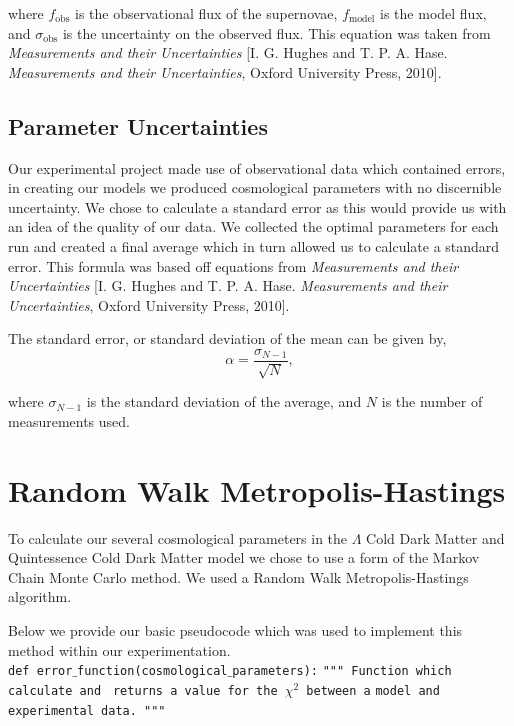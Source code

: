 \documentclass[twocolumn]{revtex4}
\begin{document}
{{{where $f_\text{obs}$ is the observational flux of the supernovae, $f_\text{model}$ is the model flux, and $\sigma_\text{obs}$ is the uncertainty on the observed flux. This equation was taken from \textit{Measurements and their Uncertainties} [I. G. Hughes and T. P. A. Hase. \textit{Measurements and their Uncertainties}, Oxford University Press, 2010].

\vspace{-3ex}
\subsection{Parameter Uncertainties}
\vspace{-2ex}
Our experimental project made use of observational data which contained errors, in creating our models we produced cosmological parameters with no discernible uncertainty. We chose to calculate a standard error as this would provide us with an idea of the quality of our data. We collected the optimal parameters for each run and created a final average which in turn allowed us to calculate a standard error. This formula was based off equations from \textit{Measurements and their Uncertainties} [I. G. Hughes and T. P. A. Hase. \textit{Measurements and their Uncertainties}, Oxford University Press, 2010].

The standard error, or standard deviation of the mean can be given by,
\begin{equation}
\alpha=\frac{\sigma_{N-1}}{\sqrt{N}},
\end{equation}

where $\sigma_{N-1}$ is the standard deviation of the average, and $N$ is the number of measurements used.
\clearpage

\vspace{-3ex}
\section{Random Walk Metropolis-Hastings}
\label{appendix:mcmc}
\vspace{-2ex}
To calculate our several cosmological parameters in the $\Lambda$ Cold Dark Matter and Quintessence Cold Dark Matter model we chose to use a form of the Markov Chain Monte Carlo method. We used a Random Walk Metropolis-Hastings algorithm. 

Below we provide our basic pseudocode which was used to implement this method within our experimentation. \\

\texttt{def error$\_$function(cosmological$\_$parameters):}
\indent\indent\indent \texttt{""" Function which calculate and } 
\indent\indent\indent \texttt{returns a value for the $\chi^2$ between a}
\indent\indent\indent \texttt{model and experimental data. """} \\

}}}
\end{document}

